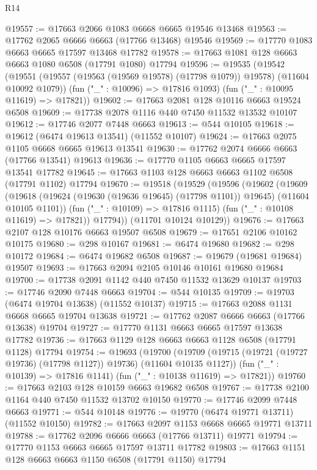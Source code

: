 \begin{lexlean}{R14}
\begin{coremodule}
@19557 := @17663 @2066 @1083 @6668 @6665 @19546 @13468
@19563 := @17762 @2065 @6666 @6663 (@17766 @13468) @19546
@19569 := @17770 @1083 @6663 @6665 @17597 @13468 @17782
@19578 := @17663 @1081 @128 @6663 @6663 @1080 @6508 (@17791 @1080) @17794
@19596 := @19535
    (@19542
      (@19551 (@19557 (@19563 (@19569 @19578) (@17798 @1079)) @19578) (@11604 @10092 @1079))
      (fun ("_" : @10096) => @17816 @1093)
      (fun ("_" : @10095 @11619) => @17821))
@19602 := @17663 @2081 @128 @10116 @6663 @19524 @6508
@19609 := @17738 @2078 @1116 @440 @7450 @11532 @13532 @10107
@19612 := @17746 @2077 @7448 @6663
@19613 := @544 @10105
@19618 := @19612 (@6474 @19613 @13541) (@11552 @10107)
@19624 := @17663 @2075 @1105 @6668 @6665 @19613 @13541
@19630 := @17762 @2074 @6666 @6663 (@17766 @13541) @19613
@19636 := @17770 @1105 @6663 @6665 @17597 @13541 @17782
@19645 := @17663 @1103 @128 @6663 @6663 @1102 @6508 (@17791 @1102) @17794
@19670 := @19518
    (@19529
      (@19596
        (@19602
          (@19609
            (@19618 (@19624 (@19630 (@19636 @19645) (@17798 @1101)) @19645) (@11604 @10105 @1101))
            (fun ("_" : @10109) => @17816 @1115)
            (fun ("_" : @10108 @11619) => @17821))
          @17794))
      (@11701 @10124 @10129))
@19676 := @17663 @2107 @128 @10176 @6663 @19507 @6508
@19679 := @17651 @2106 @10162 @10175
@19680 := @298 @10167
@19681 := @6474 @19680
@19682 := @298 @10172
@19684 := @6474 @19682 @6508
@19687 := @19679 (@19681 @19684) @19507
@19693 := @17663 @2094 @2105 @10146 @10161 @19680 @19684
@19700 := @17738 @2091 @1142 @440 @7450 @11532 @13629 @10137
@19703 := @17746 @2090 @7448 @6663
@19704 := @544 @10135
@19709 := @19703 (@6474 @19704 @13638) (@11552 @10137)
@19715 := @17663 @2088 @1131 @6668 @6665 @19704 @13638
@19721 := @17762 @2087 @6666 @6663 (@17766 @13638) @19704
@19727 := @17770 @1131 @6663 @6665 @17597 @13638 @17782
@19736 := @17663 @1129 @128 @6663 @6663 @1128 @6508 (@17791 @1128) @17794
@19754 := @19693
    (@19700
      (@19709 (@19715 (@19721 (@19727 @19736) (@17798 @1127)) @19736) (@11604 @10135 @1127))
      (fun ("_" : @10139) => @17816 @1141)
      (fun ("_" : @10138 @11619) => @17821))
@19760 := @17663 @2103 @128 @10159 @6663 @19682 @6508
@19767 := @17738 @2100 @1164 @440 @7450 @11532 @13702 @10150
@19770 := @17746 @2099 @7448 @6663
@19771 := @544 @10148
@19776 := @19770 (@6474 @19771 @13711) (@11552 @10150)
@19782 := @17663 @2097 @1153 @6668 @6665 @19771 @13711
@19788 := @17762 @2096 @6666 @6663 (@17766 @13711) @19771
@19794 := @17770 @1153 @6663 @6665 @17597 @13711 @17782
@19803 := @17663 @1151 @128 @6663 @6663 @1150 @6508 (@17791 @1150) @17794

\end{coremodule}
\end{lexlean}
